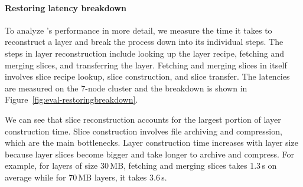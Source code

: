 \paragraph{Restoring latency breakdown}
%
To analyze \sysname{}'s performance in more detail, we measure the time it takes
to reconstruct a layer and break the process down into its individual steps.
%
The steps in layer reconstruction include looking up the layer recipe, fetching and merging 
slices, and transferring the layer. Fetching and merging slices in itself involves slice recipe 
lookup, slice construction, and slice transfer.
%
%
%
%
%
The latencies are measured on the 7-node cluster and the breakdown is shown in
Figure~\ref{fig:eval-restoringbreakdown}.

We can see that slice reconstruction accounts for the largest portion of layer construction time.
%
Slice construction involves file archiving and compression, which are the main bottlenecks.
Layer construction time increases with layer size because layer slices become bigger and
take longer to archive and compress.
%
For example, for layers of size 30\,MB, fetching and merging slices takes 1.3\,s on average while
for 70\,MB layers, it takes 3.6\,s.

